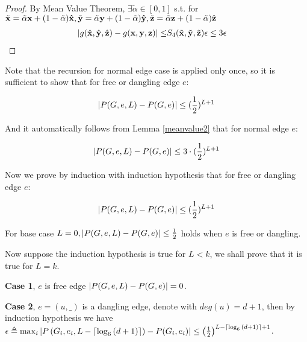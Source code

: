 \begin{proof}
         By Mean Value Theorem, $\exists \tilde{\alpha} \in [0,1]$ s.t. for $\tilde{\bf x} = \tilde{\alpha} {\bf x} + (1 - \tilde{\alpha}) {\bf \hat{x}}, \tilde{\bf y} = \tilde{\alpha} {\bf y} + (1 - \tilde{\alpha}) {\bf \hat{y}}, \tilde{\bf z} = \tilde{\alpha} {\bf z} + (1 - \tilde{\alpha}) {\bf \hat{z}}$
		\begin{align*}
		\left\vert g(\hat{\bf x}, \hat{\bf y}, \hat{\bf z}) - g({\bf x,y,z})\right\vert \leq &
		S_4(\tilde{\bf x},\tilde{\bf y},\tilde{\bf z} ) \epsilon
		\leq  3\epsilon
		\end{align*}
	\end{proof}



		Note that the recursion for normal edge case is applied only once, so it is sufficient to show that for free or dangling edge $e$:

		\[\left\vert P(G,e,L) - P(G,e)\right\vert \leq (\frac{1}{2})^{L+1}\]
		
		And it automatically follows from Lemma \ref{meanvalue2} that for normal edge $e$:

		\[\left\vert P(G,e,L) - P(G,e)\right\vert \leq 3\cdot(\frac{1}{2})^{L+1}\]

		Now we prove by induction with induction hypothesis that for free or dangling edge $e$:

		\[\left\vert P(G,e,L) - P(G,e)\right\vert \leq (\frac{1}{2})^{L+1}\]
		
		For base case $L=0, \left\vert P(G,e,L) - P(G,e)\right\vert \leq \frac{1}{2}$ holds when $e$ is free or dangling.

		Now suppose the induction hypothesis is true for $L<k$, we shall prove that it is true for $L=k$.

		{\bf Case 1}, $e$ is free edge $\left\vert P(G,e,L) - P(G,e)\right\vert = 0$.

		{\bf Case 2}, $e=(u,\_)$ is a dangling edge, denote with $deg(u)=d+1$, then by induction hypothesis we have
        $\epsilon \triangleq \max_i \left\vert P\left(G_i,e_i,L-\lceil \log_6{(d+1)}\rceil \right) - P(G_i,e_i)\right\vert \leq \left(\frac{1}{2}\right)^{L-\lceil \log_6{(d+1)}\rceil + 1}$.

